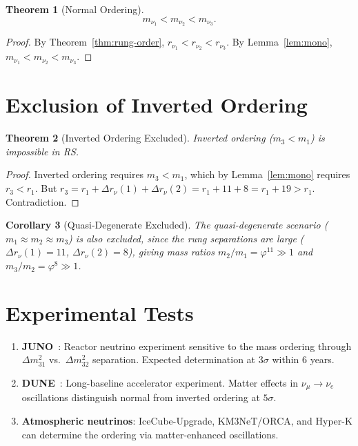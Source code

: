 \documentclass[12pt,a4paper]{article}
\newtheorem{theorem}{Theorem}[section]
\newtheorem{corollary}[theorem]{Corollary}
\theoremstyle{definition}
\theoremstyle{remark}
\begin{document}
\begin{theorem}[Normal Ordering]
\label{thm:normal}
\begin{equation}
  \boxed{m_{\nu_1} < m_{\nu_2} < m_{\nu_3}.}
\end{equation}
\end{theorem}

\begin{proof}
By Theorem~\ref{thm:rung-order}, $r_{\nu_1} < r_{\nu_2} <
r_{\nu_3}$.  By Lemma~\ref{lem:mono}, $m_{\nu_1} < m_{\nu_2} <
m_{\nu_3}$.
\end{proof}

\section{Exclusion of Inverted Ordering}
\label{sec:exclusion}

\begin{theorem}[Inverted Ordering Excluded]
\label{thm:inverted}
Inverted ordering ($m_3 < m_1$) is impossible in RS.
\end{theorem}

\begin{proof}
Inverted ordering requires $m_3 < m_1$, which by
Lemma~\ref{lem:mono} requires $r_3 < r_1$.  But
$r_3 = r_1 + \Delta r_\nu(1) + \Delta r_\nu(2)
= r_1 + 11 + 8 = r_1 + 19 > r_1$.  Contradiction.
\end{proof}

\begin{corollary}[Quasi-Degenerate Excluded]
The quasi-degenerate scenario ($m_1 \approx m_2 \approx m_3$) is
also excluded, since the rung separations are large
($\Delta r_\nu(1) = 11$, $\Delta r_\nu(2) = 8$), giving mass ratios
$m_2/m_1 = \varphi^{11} \gg 1$ and $m_3/m_2 = \varphi^{8} \gg 1$.
\end{corollary}

\section{Experimental Tests}
\label{sec:tests}

\begin{enumerate}
  \item \textbf{JUNO}~\cite{JUNO}: Reactor neutrino experiment
  sensitive to the mass ordering through $\Delta m_{31}^2$ vs.\
  $\Delta m_{32}^2$ separation.  Expected determination at
  $3\sigma$ within 6 years.

  \item \textbf{DUNE}~\cite{DUNE}: Long-baseline accelerator
  experiment.  Matter effects in $\nu_\mu \to \nu_e$ oscillations
  distinguish normal from inverted ordering at $5\sigma$.

  \item \textbf{Atmospheric neutrinos}:
  IceCube-Upgrade, KM3NeT/ORCA, and Hyper-K
  can determine the ordering via
  matter-enhanced oscillations.
\end{enumerate}
\end{document}
